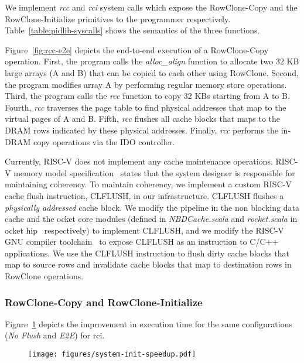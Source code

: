We implement \emph{rcc} and \emph{rci} system calls which expose the RowClone-Copy and the RowClone-Initialize primitives to the programmer respectively. Table~\ref{table:pidlib-syscalls} shows the semantics of the three functions.

Figure~\ref{fig:rcc-e2e} depicts the end-to-end execution of a RowClone-Copy operation. First, the program calls the \emph{alloc\_align} function to allocate two 32 KB large arrays (A and B) that can be copied to each other using RowClone. Second, the program modifies array A by performing regular memory store operations. Third, the program calls the \emph{rcc} function to copy 32 KBs starting from A to B. Fourth, \emph{rcc} traverses the page table to find physical addresses that map to the virtual pages of A and B. Fifth, \emph{rcc} flushes all cache blocks that maps to the DRAM rows indicated by these physical addresses. Finally, \emph{rcc} performs the in-DRAM copy operations via the IDO controller.

Currently, RISC-V does not implement any cache maintenance operations. RISC-V memory model specification~\cite{X} states that the system designer is responsible for maintaining coherency. To maintain coherency, we implement a custom RISC-V cache flush instruction, CLFLUSH, in our infrastructure. CLFLUSH flushes a \textit{physically addressed} cache block. We modify the pipeline in the non blocking data cache and the ocket core modules (defined in \textit{NBDCache.scala} and \textit{rocket.scala} in ocket hip~\cite{X} respectively) to implement CLFLUSH, and we modify the RISC-V GNU compiler toolchain~\cite{X} to expose CLFLUSH as an instruction to C/C++ applications. We use the CLFLUSH instruction to flush dirty cache blocks that map to source rows and invalidate cache blocks that map to destination rows in RowClone operations.


\subsubsection{RowClone-Copy and RowClone-Initialize}
\fi

\iffalse
Figure~\ref{fig:system-init-speedup} depicts the improvement in execution time for the same configurations (\emph{No Flush} and \emph{E2E}) for rci. 

\begin{figure}[h] %
  \centering
  \texttt{[image: figures/system-init-speedup.pdf]}
  \caption{}
  \label{fig:system-init-speedup}
\end{figure}


